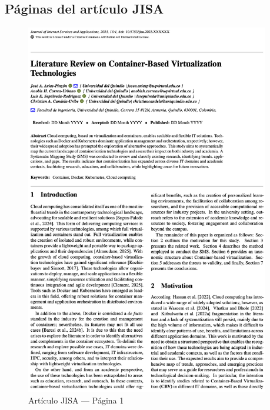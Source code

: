\subsection{Páginas del artículo JISA}

\begin{figure}[H]
	\centering
	\begin{tcolorbox}[
			colback=white,
			colframe=gray!50,
			boxrule=1pt,
			arc=2pt,
			boxsep=5pt,
			left=3pt,
			right=3pt,
			top=3pt,
			bottom=3pt,
			drop shadow
		]
		\includegraphics[width=0.95\textwidth,keepaspectratio]{apendices/JISA/pagina_1.png}
	\end{tcolorbox}
	\caption{Artículo JISA --- Página 1}\label{fig:jisa-pagina-1}
\end{figure}
\FloatBarrier%
